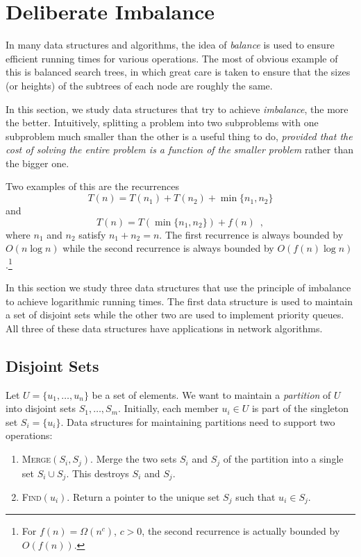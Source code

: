 \chapter{Deliberate Imbalance}


In many data structures and algorithms, the idea of \emph{balance} is
used to ensure efficient running times for various operations.  The
most of obvious example of this is balanced search trees, in which
great care is taken to ensure that the sizes (or heights) of the
subtrees of each node are roughly the same.

In this section, we study data structures that try to achieve
\emph{imbalance}, the more the better.  Intuitively, splitting a
problem into two subproblems with one subproblem much smaller than the
other is a useful thing to do, \emph{provided that the cost of solving
the entire problem is a function of the smaller problem} rather than
the bigger one.

Two examples of this are the recurrences
\[ 
	T(n) = T(n_1) + T(n_2) + \min\{n_1,n_2\}  
\]
and 
\[
	T(n) = T(\min\{n_1,n_2\}) + f(n) \enspace ,
\]
where $n_1$ and $n_2$ satisfy $n_1+n_2=n$.  The first recurrence is
always bounded by $O(n\log n)$ while the second recurrence is always
bounded by $O(f(n)\log n)$.\footnote{For $f(n)=\Omega(n^c)$, $c>0$,
the second recurrence is actually bounded by $O(f(n))$.}

In this section we study three data structures that use the principle
of imbalance to achieve logarithmic running times.  The first data
structure is used to maintain a set of disjoint sets while the other
two are used to implement priority queues.  All three of these data
structures have applications in network algorithms.

\section{Disjoint Sets}

Let $U=\{u_1,\ldots,u_n\}$ be a set of elements.  We want to maintain
a \emph{partition} of $U$ into disjoint sets $S_1,\ldots,S_m$.
Initially, each member $u_i\in U$ is part of the singleton set
$S_i=\{u_i\}$.  Data structures for maintaining partitions need to
support two operations: 
\begin{enumerate}
\item \textsc{Merge$(S_i,S_j)$}.  Merge the two sets $S_i$ and $S_j$
of the partition into a single set $S_i\cup S_j$.  This destroys $S_i$
and $S_j$.

\item \textsc{Find$(u_i)$}. Return a pointer to the unique set $S_j$
such that $u_i\in S_j$.
\end{enumerate}

